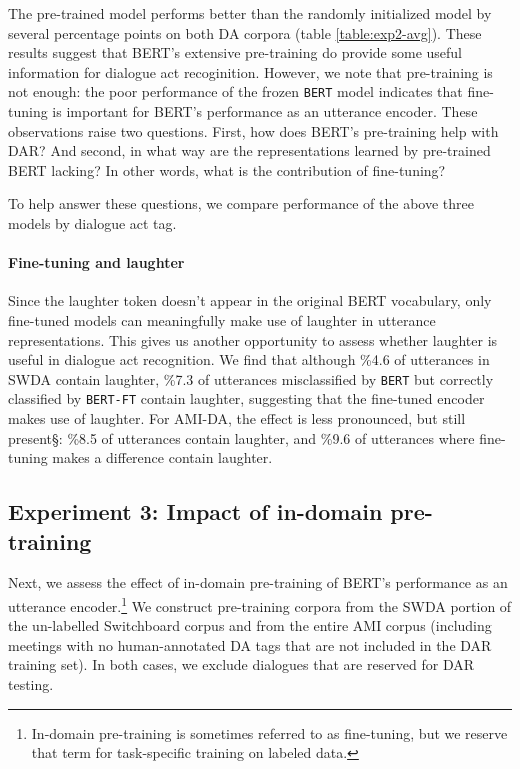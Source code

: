 \documentclass[11pt,a4paper]{article}
\begin{document}
The pre-trained model performs better than the randomly initialized model by several percentage points on both DA corpora (table \ref{table:exp2-avg}). 
These results suggest that BERT's extensive pre-training do provide some useful information for dialogue act recoginition.
However, we note that pre-training is not enough: the poor performance of the frozen \texttt{BERT} model indicates that fine-tuning is important for BERT's performance as an utterance encoder.
These observations raise two questions.
First, how does BERT's pre-training help with DAR? 
And second, in what way are the representations learned by pre-trained BERT lacking?
In other words, what is the contribution of fine-tuning?

To help answer these questions, we compare performance of the above three models by dialogue act tag.


\paragraph{Fine-tuning and laughter}
Since the laughter token doesn't appear in the original BERT vocabulary, only fine-tuned models can meaningfully make use of laughter in utterance representations. 
This gives us another opportunity to assess whether laughter is useful in dialogue act recognition.
We find that although \%4.6 of utterances in SWDA contain laughter, \%7.3 of utterances misclassified by \texttt{BERT} but correctly classified by \texttt{BERT-FT} contain laughter, suggesting that the fine-tuned encoder makes use of laughter. 
For AMI-DA, the effect is less pronounced, but still present§: \%8.5 of utterances contain laughter, and \%9.6 of utterances where fine-tuning makes a difference contain laughter.

\subsection{Experiment 3: Impact of in-domain pre-training} \label{sec:experiment3} %

Next, we assess the effect of in-domain pre-training of BERT's performance as an utterance encoder.\footnote{
In-domain pre-training is sometimes referred to as fine-tuning, but we reserve that term for task-specific training on labeled data.}
We construct pre-training corpora from the SWDA portion of the un-labelled Switchboard corpus and from the entire AMI corpus (including meetings with no human-annotated DA tags that are not included in the DAR training set).
In both cases, we exclude dialogues that are reserved for DAR testing.
\end{document}
